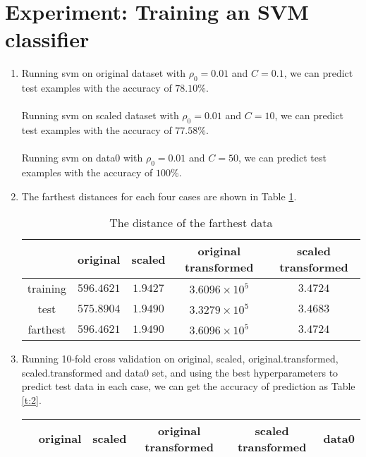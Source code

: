 \documentclass[12pt, fullpage,letterpaper]{article}
\begin{document}
\section{Experiment: Training an SVM classifier}
\begin{enumerate}
\item Running svm on original dataset with $\rho_0=0.01$ and $C=0.1$, we can predict test examples with the accuracy of $78.10\%$.\\
\\
 Running svm on scaled dataset with $\rho_0=0.01$ and $C=10$, we can predict test examples with the accuracy of $77.58\%$.\\
 \\
 Running svm on data0  with $\rho_0=0.01$ and $C=50$, we can predict test examples with the accuracy of $100\%$.\\


\item The farthest distances for each four cases  are shown in Table \ref{t:1}.
\begin{table}[h]
    \centering
    \begin{tabular}{|c|c|c|c|c|}
    \hline
             &   original  & scaled   &  original transformed & scaled transformed  \\
             \hline
      training & $  596.4621$   & $1.9427$   &  $3.6096\times 10^5$    & $3.4724$  \\
 
      test     &   $575.8904$   & $1.9490$   &   $3.3279 \times 10^5$ & $3.4683$  \\

\hline
      farthest  & $  596.4621$    & $1.9490$   & $3.6096\times 10^5$    & $3.4724$   \\

      \hline
    \end{tabular}
    \caption{The distance of the farthest data }\label{t:1}
  \end{table}
\item Running 10-fold cross validation on original, 
 scaled, original.transformed, scaled.transformed and data0 set, and using the best  hyperparameters to predict test data in each case, we can get the accuracy of prediction as Table \ref{t:2}. 


 \begin{table}[h]
    \centering
    \begin{tabular}{|c|c|c|c|c|c|}
    \hline
      & original  & scaled   &  original transformed & scaled transformed & data0 \\
             \hline


\end{tabular}
\end{table}
\end{enumerate}
\end{document}
